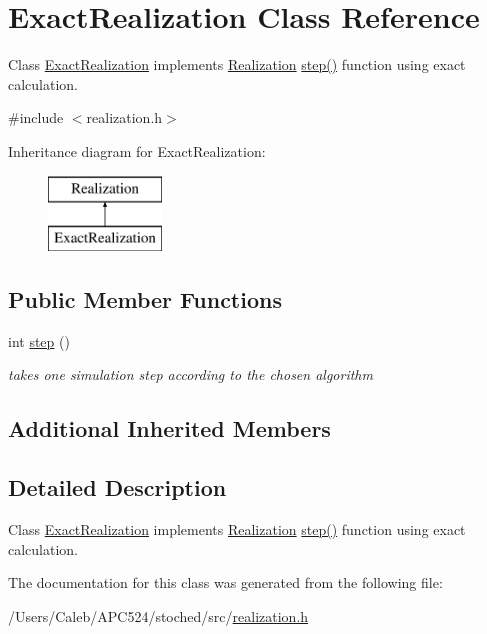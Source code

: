 \hypertarget{class_exact_realization}{}\section{Exact\+Realization Class Reference}
\label{class_exact_realization}


Class \hyperlink{class_exact_realization}{Exact\+Realization} implements \hyperlink{class_realization}{Realization} \hyperlink{class_exact_realization_a3dfa40f473f2cfce2263f4d304af3828}{step()} function using exact calculation.  




{\ttfamily \#include $<$realization.\+h$>$}

Inheritance diagram for Exact\+Realization\+:\begin{figure}[H]
\begin{center}
\leavevmode
\includegraphics[height=2.000000cm]{class_exact_realization}
\end{center}
\end{figure}
\subsection*{Public Member Functions}
\begin{DoxyCompactItemize}
\item 
\mbox{\label{class_exact_realization_a3dfa40f473f2cfce2263f4d304af3828}} 
int \hyperlink{class_exact_realization_a3dfa40f473f2cfce2263f4d304af3828}{step} ()
\begin{DoxyCompactList}\small\item\em takes one simulation step according to the chosen algorithm \end{DoxyCompactList}\end{DoxyCompactItemize}
\subsection*{Additional Inherited Members}


\subsection{Detailed Description}
Class \hyperlink{class_exact_realization}{Exact\+Realization} implements \hyperlink{class_realization}{Realization} \hyperlink{class_exact_realization_a3dfa40f473f2cfce2263f4d304af3828}{step()} function using exact calculation. 

The documentation for this class was generated from the following file\+:\begin{DoxyCompactItemize}
\item 
/\+Users/\+Caleb/\+A\+P\+C524/stoched/src/\hyperlink{realization_8h}{realization.\+h}\end{DoxyCompactItemize}
